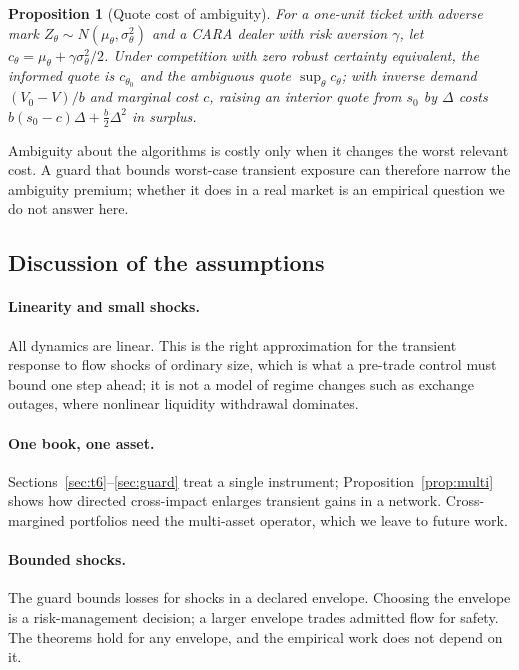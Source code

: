 \documentclass[12pt]{article}
\newtheorem{proposition}[theorem]{Proposition}
\theoremstyle{definition}
\theoremstyle{remark}
\begin{document}
\begin{proposition}[Quote cost of ambiguity]\label{prop:ambig}
For a one-unit ticket with adverse mark $Z_\theta\sim N(\mu_\theta,\sigma_\theta^2)$ and a CARA dealer with risk aversion $\gamma$, let $c_\theta=\mu_\theta+\gamma\sigma_\theta^2/2$. Under competition with zero robust certainty equivalent, the informed quote is $c_{\theta_0}$ and the ambiguous quote $\sup_\theta c_\theta$; with inverse demand $(V_0-V)/b$ and marginal cost $c$, raising an interior quote from $s_0$ by $\Delta$ costs $b(s_0-c)\Delta+\tfrac b2\Delta^2$ in surplus.
\end{proposition}

Ambiguity about the algorithms is costly only when it changes the worst relevant cost. A guard that bounds worst-case transient exposure can therefore narrow the ambiguity premium; whether it does in a real market is an empirical question we do not answer here.

\subsection{Discussion of the assumptions}

\paragraph{Linearity and small shocks.} All dynamics are linear. This is the right approximation for the transient response to flow shocks of ordinary size, which is what a pre-trade control must bound one step ahead; it is not a model of regime changes such as exchange outages, where nonlinear liquidity withdrawal dominates.

\paragraph{One book, one asset.} Sections~\ref{sec:t6}--\ref{sec:guard} treat a single instrument; Proposition~\ref{prop:multi} shows how directed cross-impact enlarges transient gains in a network. Cross-margined portfolios need the multi-asset operator, which we leave to future work.

\paragraph{Bounded shocks.} The guard bounds losses for shocks in a declared envelope. Choosing the envelope is a risk-management decision; a larger envelope trades admitted flow for safety. The theorems hold for any envelope, and the empirical work does not depend on it.
\end{document}
